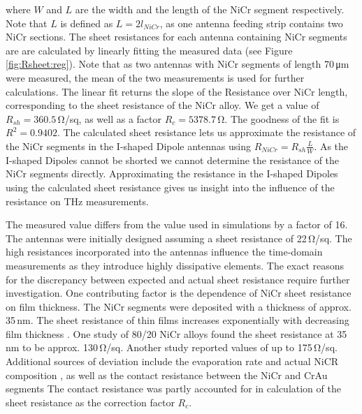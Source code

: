 where $W$ and $L$  are the width and the length of the NiCr segment respectively. Note that $L$ is defined as $L = 2l_{NiCr}$, as one antenna feeding strip contains two NiCr sections. The sheet resistances for each antenna containing NiCr segments are 
are calculated by linearly fitting the measured data (see Figure \ref{fig:Rsheet:reg}). Note that as two antennas with NiCr segments of length \num{70}\,\si{\micro \meter} were measured, the mean of the two measurements is used for further calculations. The linear fit returns the slope of the Resistance over NiCr length, corresponding to the sheet resistance of the NiCr alloy. We get a value of $R_{sh} = 360.5$\,\si{\ohm}/sq, as well as a factor $R_c = 5378.7$\,\si{\ohm}. The goodness of the fit is $R^2 = 0.9402$. The calculated sheet resistance lets us approximate the resistance of the NiCr segments in the I-shaped Dipole antennas using $R_{NiCr} = R_{sh}\frac{L}{W}$. As the I-shaped Dipoles cannot be shorted we cannot determine the resistance of the NiCr segments directly. Approximating the resistance in the I-shaped Dipoles using the calculated sheet resistance gives us insight into the influence of the resistance on THz measurements.

The measured value differs from the value used in simulations by a factor of \num{16}. The antennas were initially designed assuming a sheet resistance of \num{22}\,\si{\ohm}/sq. The high resistances incorporated into the antennas influence the time-domain measurements as they introduce highly dissipative elements. The exact reasons for the discrepancy between expected and actual sheet resistance require further investigation. One contributing factor is the dependence of NiCr sheet resistance on film thickness. The NiCr segments were deposited with a thickness of approx. \num{35}\,\si{\nano \meter}. The sheet resistance of thin films increases exponentially with decreasing film thickness \cite{wittElectromechanicalPropertiesThin1974}. One study of \num{80}/\num{20} NiCr alloys found the sheet resistance at \num{35}\,\si{\nano \meter} to be approx. \num{130}\,\si{\ohm}/sq. Another study reported values of up to \num{175}\,\si{\ohm}/sq. Additional sources of deviation include the evaporation rate and actual NiCR composition \cite{rolkeNichromeThinFilm1981}, as well as the contact resistance between the NiCr and CrAu segments \cite{zhangAnalysisCurrentCrowding2015} The contact resistance was partly accounted for in calculation of the sheet resistance as the correction factor $R_c$. 

